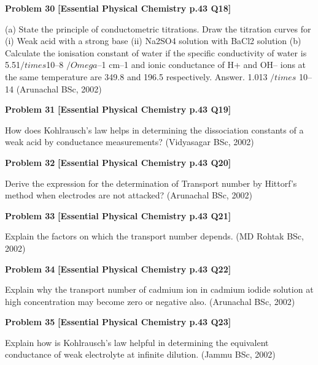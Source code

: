 \begin{problembox}
\textbf{Problem 30} \hfill \textbf{[Essential Physical Chemistry p.43 Q18]}
\label{q:ext-essential_all_questions-30}

(a)
State the principle of conductometric titrations. Draw the titration curves for
(i)
Weak acid with a strong base
(ii)
Na2SO4 solution with BaCl2 solution
(b)
Calculate the ionisation constant of water if the specific conductivity of water is
5.51$/times$10--8 $/Omega$--1 cm--1 and ionic conductance of H+ and OH-- ions at the same temperature are
349.8 and 196.5 respectively.
Answer. 1.013 $/times$ 10--14
(Arunachal BSc, 2002)
\end{problembox}

\begin{problembox}
\textbf{Problem 31} \hfill \textbf{[Essential Physical Chemistry p.43 Q19]}
\label{q:ext-essential_all_questions-31}

How does Kohlrausch's law helps in determining the dissociation constants of a weak acid by
conductance measurements?
(Vidyasagar BSc, 2002)
\end{problembox}

\begin{problembox}
\textbf{Problem 32} \hfill \textbf{[Essential Physical Chemistry p.43 Q20]}
\label{q:ext-essential_all_questions-32}

Derive the expression for the determination of Transport number by Hittorf's method when electrodes
are not attacked?
(Arunachal BSc, 2002)
\end{problembox}

\begin{problembox}
\textbf{Problem 33} \hfill \textbf{[Essential Physical Chemistry p.43 Q21]}
\label{q:ext-essential_all_questions-33}

Explain the factors on which the transport number depends.
(MD Rohtak BSc, 2002)
\end{problembox}

\begin{problembox}
\textbf{Problem 34} \hfill \textbf{[Essential Physical Chemistry p.43 Q22]}
\label{q:ext-essential_all_questions-34}

Explain why the transport number of cadmium ion in cadmium iodide solution at high concentration
may become zero or negative also.
(Arunachal BSc, 2002)
\end{problembox}

\begin{problembox}
\textbf{Problem 35} \hfill \textbf{[Essential Physical Chemistry p.43 Q23]}
\label{q:ext-essential_all_questions-35}

Explain how is Kohlrausch's law helpful in determining the equivalent conductance of weak electrolyte
at infinite dilution.
(Jammu BSc, 2002)
\end{problembox}

